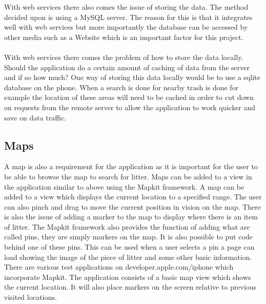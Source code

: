 \documentclass[12pt]{article}
\begin{document}
With web services there also comes the issue of storing the data. The method decided upon is using a MySQL server. The reason for this is that it integrates well with web services but more importantly the database can be accessed by other media such as a Website which is an important factor for this project.

\paragraph{}
\label{par:First Paragraph}

With web services there comes the problem of how to store the data locally. Should the application do a certain amount of caching of data from the server and if so how much? 
One way of storing this data locally would be to use a sqlite database on the phone. When a search is done for nearby trash is done for example the location of these areas will need to be cached in order to cut down on requests from the remote server to allow the application to work quicker and save on data traffic.

\subsection{Maps}

A map is also a requirement for the application as it is important for the user to be able to browse the map to search for litter.
Maps can be added to a view in the application similar to above using the Mapkit framework. A map can be added to a view which displays the current location to a specified range. The user can also pinch and drag to move the current position in vision on the map. There is also the issue of adding a marker to the map to display where there is an item of litter. The Mapkit framework also provides the function of adding what are called pins, they are simply markers on the map. It is also possible to put code behind one of these pins. This can be used when a user selects a pin a page can load showing the image of the piece of litter and some other basic information.
There are various test applications on developer.apple.com/iphone which incorporate Mapkit. The application consists of a basic map view which shows the current location. It will also place markers on the screen relative to previous visited locations.

\paragraph{}
\label{par:First Paragraph}
\end{document}
